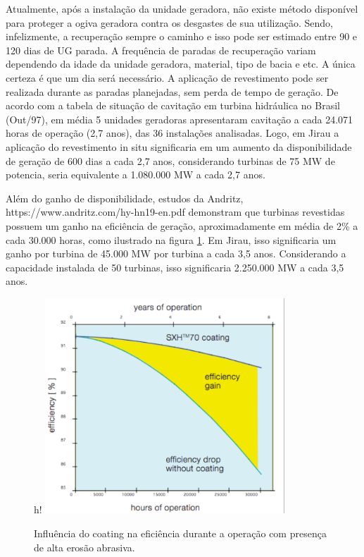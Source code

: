 Atualmente, após a instalação da unidade geradora, não existe método disponível
para proteger a ogiva geradora contra os desgastes de sua utilização. Sendo,
infelizmente, a recuperação sempre o caminho e isso pode ser estimado entre 90 e
120 dias de UG parada. A frequência de paradas de recuperação variam dependendo
da idade da unidade geradora, material, tipo de bacia e etc. A única certeza é
que um dia será necessário. A aplicação de revestimento pode ser realizada
durante as paradas planejadas, sem perda de tempo de geração.
De acordo com a tabela de situação de cavitação em turbina hidráulica no Brasil
(Out/97), em média 5 unidades geradoras apresentaram  cavitação a cada 24.071
horas de operação (2,7 anos), das 36 instalações analisadas. Logo, em Jirau a
aplicação do revestimento in situ significaria em um aumento da disponibilidade
de geração de 600 dias a cada 2,7 anos, considerando turbinas de 75 MW de
potencia, seria equivalente a 1.080.000 MW a cada 2,7 anos.

Além do ganho de disponibilidade, estudos da Andritz,
https://www.andritz.com/hy-hn19-en.pdf demonstram que turbinas revestidas
possuem um ganho na eficiência de geração, aproximadamente em média de 2\% a
cada 30.000 horas, como ilustrado na figura \ref{fig:coating_graph}. Em Jirau,
isso significaria um ganho por turbina de 45.000 MW por turbina a cada 3,5 anos. Considerando a capacidade instalada de
50 turbinas, isso significaria 2.250.000 MW a cada 3,5 anos.

\begin{figure}{h!}
\includegraphics[width=0.8\textwidth]{figs/coating_graph}
\caption{Influência do coating na eficiência durante a operação com presença de
alta erosão abrasiva.}
\label{fig:coating_graph}
\end{figure}

